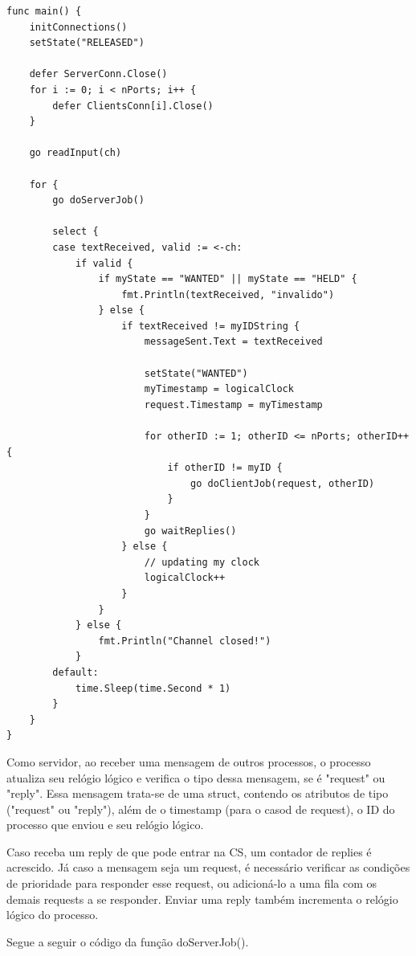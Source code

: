 \documentclass[conference]{IEEEtran}
\begin{document}
\begin{lstlisting}
func main() {
	initConnections()
	setState("RELEASED")

	defer ServerConn.Close()
	for i := 0; i < nPorts; i++ {
		defer ClientsConn[i].Close()
	}

	go readInput(ch)
	
	for {
		go doServerJob()
		
		select {
		case textReceived, valid := <-ch:
			if valid {
				if myState == "WANTED" || myState == "HELD" {
					fmt.Println(textReceived, "invalido")
				} else {
					if textReceived != myIDString {
						messageSent.Text = textReceived

						setState("WANTED")
						myTimestamp = logicalClock
						request.Timestamp = myTimestamp

						for otherID := 1; otherID <= nPorts; otherID++ {
							if otherID != myID {
								go doClientJob(request, otherID)
							}
						}
						go waitReplies()
					} else {
						// updating my clock
						logicalClock++
					}
				}
			} else {
				fmt.Println("Channel closed!")
			}
		default:
			time.Sleep(time.Second * 1)
		}
	}
}
\end{lstlisting}

	Como servidor, ao receber uma mensagem de outros processos, o processo atualiza seu relógio lógico e verifica o tipo dessa mensagem, se é "request" ou "reply". Essa mensagem trata-se de uma struct, contendo os atributos de tipo ("request" ou "reply"), além de o timestamp (para o casod de request), o ID do processo que enviou e seu relógio lógico. 
	
	Caso receba um reply de que pode entrar na CS, um contador de replies é acrescido. Já caso a mensagem seja um request, é necessário verificar as condições de prioridade para responder esse request, ou adicioná-lo a uma fila com os demais requests a se responder. Enviar uma reply também incrementa o relógio lógico do processo.
	
	Segue a seguir o código da função doServerJob(). 
\end{document}
